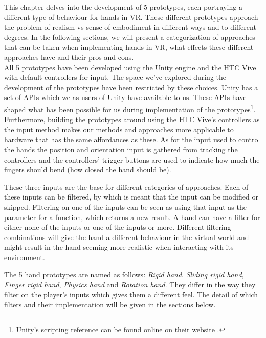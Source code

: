 This chapter delves into the development of 5 prototypes, each portraying a different type of behaviour for hands in VR. These different prototypes approach the problem of realism vs sense of embodiment in different ways and to different degrees. In the following sections, we will present a categorization of approaches that can be taken when implementing hands in VR, what effects these different approaches have and their pros and cons.\\

All 5 prototypes have been developed using the Unity engine and the HTC Vive with default controllers for input. The space we've explored during the development of the prototypes have been restricted by these choices. Unity has a set of APIs which we as users of Unity have available to us. These APIs have shaped what has been possible for us during implementation of the prototypes\footnote{Unity's scripting reference can be found online on their website \parencite{UnityScriptingReference2017}.}. Furthermore, building the prototypes around using the HTC Vive's controllers as the input method makes our methods and approaches more applicable to hardware that has the same affordances as these. As for the input used to control the hands the position and orientation input is gathered from tracking the controllers and the controllers' trigger buttons are used to indicate how much the fingers should bend (how closed the hand should be).

These three inputs are the base for different categories of approaches. Each of these inputs can be filtered, by which is meant that the input can be modified or skipped. Filtering on one of the inputs can be seen as using that input as the parameter for a function, which returns a new result. A hand can have a filter for either none of the inputs or one of the inputs or more. Different filtering combinations will give the hand a different behaviour in the virtual world and might result in the hand seeming more realistic when interacting with its environment.

The 5 hand prototypes are named as follows: \textit{Rigid hand}, \textit{Sliding rigid hand}, \textit{Finger rigid hand}, \textit{Physics hand} and \textit{Rotation hand}. They differ in the way they filter on the player's inputs which gives them a different feel. The detail of which filters and their implementation will be given in the sections below.

